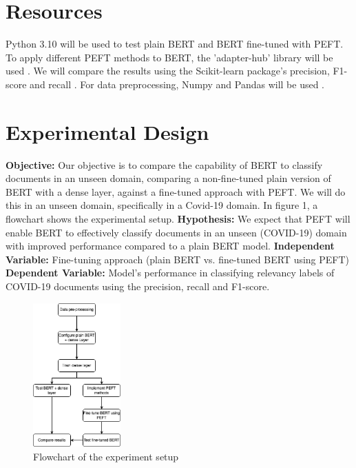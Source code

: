 \documentclass{IEEEtran}
\begin{document}
\section{Resources}
Python 3.10 will be used to test plain BERT and BERT fine-tuned with PEFT. To apply different PEFT methods to BERT, the 'adapter-hub' library will be used \cite{pfeiffer2020}. We will compare the results using the Scikit-learn package's precision, F1-score and recall \cite{scikit-learn}. For data preprocessing, Numpy and Pandas will be used \cite{harris2020array, mckinney2010data}. 

\section{Experimental Design}

\textbf{Objective:} Our objective is to compare the capability of BERT to classify documents in an unseen domain, comparing a non-fine-tuned plain version of BERT with a dense layer, against a fine-tuned approach with PEFT. We will do this in an unseen domain, specifically in a Covid-19 domain. In figure 1, a flowchart shows the experimental setup.
\textbf{Hypothesis:} We expect that PEFT will enable BERT to effectively classify documents in an unseen (COVID-19) domain with improved performance compared to a plain BERT model. 
\textbf{Independent Variable:} Fine-tuning approach (plain BERT vs. fine-tuned BERT using PEFT)
\textbf{Dependent Variable:} Model’s performance in classifying relevancy labels of COVID-19 documents using the precision, recall and F1-score.

\begin{figure}[h]
    \centering
    \includegraphics[width=0.30\textwidth]{flowchart.drawio.png}
    \caption{Flowchart of the experiment setup}
    \label{fig:my_image}
\end{figure}



\end{document}
